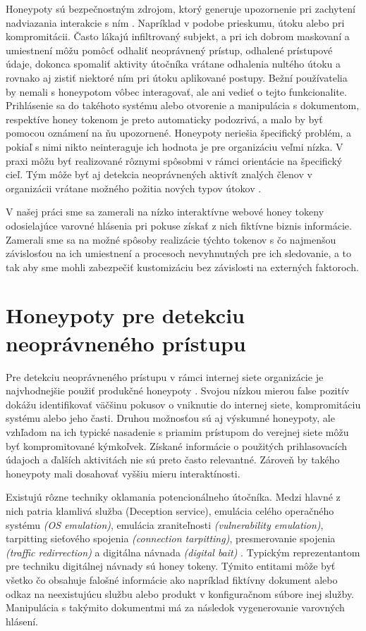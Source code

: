 \documentclass[conference, 11pt,slovak,a4paper,twoside]{IEEEtran}
\begin{document}
Honeypoty sú bezpečnostným zdrojom, ktorý generuje upozornenie pri zachytení nadviazania interakcie s ním \cite{sanders_intrusion_2020}. Napríklad v podobe prieskumu, útoku alebo pri kompromitácii. Často lákajú infiltrovaný subjekt, a pri ich dobrom maskovaní a umiestnení môžu pomôcť odhaliť neoprávnený prístup, odhalené prístupové údaje, dokonca spomaliť aktivity útočníka vrátane odhalenia nultého útoku a rovnako aj zistiť niektoré ním pri útoku aplikované postupy. Bežní používatelia by nemali s honeypotom vôbec interagovať, ale ani vedieť o tejto funkcionalite. Prihlásenie sa do takéhoto systému alebo otvorenie a manipulácia s dokumentom, respektíve honey tokenom \cite{ng_honeypot_2018} je preto automaticky podozrivá, a malo by byť pomocou oznámení na ňu upozornené. Honeypoty neriešia špecifický problém, a pokiaľ s nimi nikto neinteraguje ich hodnota je pre organizáciu veľmi nízka. V praxi môžu byť realizované rôznymi spôsobmi v rámci orientácie na špecifický cieľ. Tým môže byť aj detekcia neoprávnených aktivít znalých členov v organizácii vrátane možného požitia nových typov útokov \cite{spitzner_honeypots_2003}.

V našej práci sme sa zamerali na nízko interaktívne webové honey tokeny odosielajúce varovné hlásenia pri pokuse získať z nich fiktívne biznis informácie. Zamerali sme sa na možné spôsoby realizácie týchto tokenov s čo najmenšou závislosťou na ich umiestnení a procesoch nevyhnutných pre ich sledovanie, a to tak aby sme mohli zabezpečiť kustomizáciu bez závislosti na externých faktoroch.


\section{Honeypoty pre detekciu neoprávneného prístupu}

Pre detekciu neoprávneného prístupu v rámci internej siete organizácie je najvhodnejšie použiť produkčné honeypoty \cite{jahankhani_analysis_2015}. Svojou nízkou mierou false pozitív dokážu identifikovať väčšinu pokusov o vniknutie do internej siete, kompromitáciu systému alebo jeho časti. Druhou možnosťou sú aj výskumné honeypoty, ale vzhľadom na ich typické nasadenie s priamim prístupom do verejnej siete môžu byť kompromitované kýmkoľvek. Získané informácie o použitých prihlasovacích údajoch a ďalších aktivitách nie sú preto často relevantné. Zároveň by takého honeypoty mali dosahovať vyššiu mieru interaktínosti.

Existujú rôzne techniky oklamania potencionálneho útočníka. Medzi hlavné z nich patria klamlivá služba (Deception service), emulácia celého operačného systému \emph{(OS emulation)}, emulácia zraniteľnosti \emph{(vulnerability emulation)}, tarpitting sieťového spojenia \emph{(connection tarpitting)}, presmerovanie spojenia \emph{(traffic redirrection)} a digitálna návnada \emph{(digital bait)} \cite{qassrawi_deception_2010}. Typickým reprezentantom pre techniku digitálnej návnady sú honey tokeny. Týmito entitami môže byť všetko čo obsahuje falošné informácie \cite{qassrawi_deception_2010} ako napríklad fiktívny dokument alebo odkaz na neexistujúcu službu alebo produkt v konfiguračnom súbore inej služby. Manipulácia s takýmito dokumentmi má za následok vygenerovanie varovných hlásení.
\end{document}
